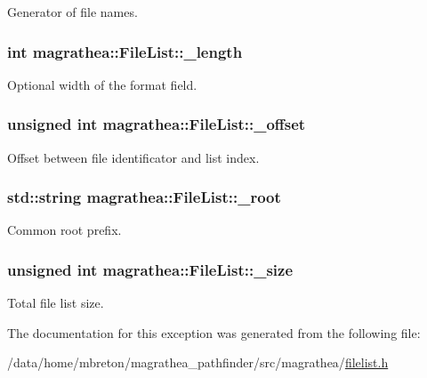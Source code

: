 Generator of file names. 

\hypertarget{exceptionmagrathea_1_1FileList_a5cf636b1b4d2779dc42f19a55cef64b8}{
\subsubsection[{\-\_\-length}]{\setlength{\rightskip}{0pt plus 5cm}int magrathea\-::\-File\-List\-::\-\_\-length}}\label{exceptionmagrathea_1_1FileList_a5cf636b1b4d2779dc42f19a55cef64b8}


Optional width of the format field. 

\hypertarget{exceptionmagrathea_1_1FileList_a134bb92386ba0ca11879f66c534eecc1}{
\subsubsection[{\-\_\-offset}]{\setlength{\rightskip}{0pt plus 5cm}unsigned int magrathea\-::\-File\-List\-::\-\_\-offset}}\label{exceptionmagrathea_1_1FileList_a134bb92386ba0ca11879f66c534eecc1}


Offset between file identificator and list index. 

\hypertarget{exceptionmagrathea_1_1FileList_ade7181de1eb09d72b7f31dc23706543e}{
\subsubsection[{\-\_\-root}]{\setlength{\rightskip}{0pt plus 5cm}std\-::string magrathea\-::\-File\-List\-::\-\_\-root}}\label{exceptionmagrathea_1_1FileList_ade7181de1eb09d72b7f31dc23706543e}


Common root prefix. 

\hypertarget{exceptionmagrathea_1_1FileList_a23c0c6219ba569c2851ac0c63557c4d0}{
\subsubsection[{\-\_\-size}]{\setlength{\rightskip}{0pt plus 5cm}unsigned int magrathea\-::\-File\-List\-::\-\_\-size}}\label{exceptionmagrathea_1_1FileList_a23c0c6219ba569c2851ac0c63557c4d0}


Total file list size. 



The documentation for this exception was generated from the following file\-:\begin{DoxyCompactItemize}
\item 
/data/home/mbreton/magrathea\-\_\-pathfinder/src/magrathea/\hyperlink{filelist_8h}{filelist.\-h}\end{DoxyCompactItemize}
